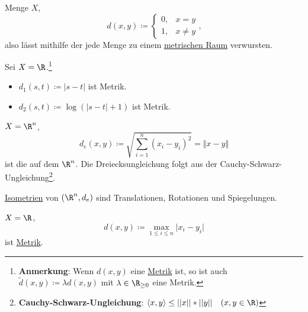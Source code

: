 \begin{example}\label{bsp:trivialeMetrik}
  Menge \( X \),
  \begin{equation*}
    d(x, y) \coloneqq \begin{cases}
    0, &x = y \\
    1, & x \neq y
  \end{cases}\text{,}
  \end{equation*}
  also lässt mithilfe der  jede Menge zu einem \hyperref[def:metrischerRaum]{metrischen Raum} verwursten. 
\end{example}

\begin{example}\label{bsp:simpleMetriken}
  Sei \( X = \R \).\footnote{\textbf{Anmerkung}: Wenn \( d(x, y) \) eine \hyperref[def:metrik]{Metrik} ist, so ist auch \( \widetilde{d}(x, y) \coloneqq \lambda d(x, y) \) mit \( \lambda \in \R_{\geq 0} \) eine Metrik.}
  \begin{itemize}
    \item \( d_1(s, t) \coloneqq |s-t| \) ist Metrik.
    \item \( d_2(s, t) \coloneqq \log(|s-t|+1) \) ist Metrik.
  \end{itemize}
\end{example}

\begin{example}\label{bsp:standardmetrik}
  \( X = \R^n \),
  \begin{equation*}
    d_e(x, y) \coloneqq \sqrt{\sum_{i=1}^n{(x_i-y_i)}^2} = \Vert x-y \Vert
  \end{equation*}
  ist die  auf dem \( \R^n \). Die Dreiecksungleichung folgt aus der Cauchy-Schwarz-Ungleichung\footnote{\textbf{Cauchy-Schwarz-Ungleichung}: \( \langle x, y \rangle \leq ||x||*||y|| \quad (x, y \in \R) \)}.
\end{example}

\begin{remark}[aus LA II]
  \hyperref[def:isometrie]{Isometrien} von \( (\R^n, d_e) \) sind Translationen, Rotationen und Spiegelungen.
\end{remark}

\begin{example}[Maximumsmetrik]\label{bsp:maximumsmetrik}
  \( X = \R \),
  \begin{equation*}
    d(x, y) \coloneqq \underset{1 \leq i \leq n}{\max} \vert x_i-y_i \vert
  \end{equation*}
  ist \hyperref[def:metrik]{Metrik}.
\end{example}

